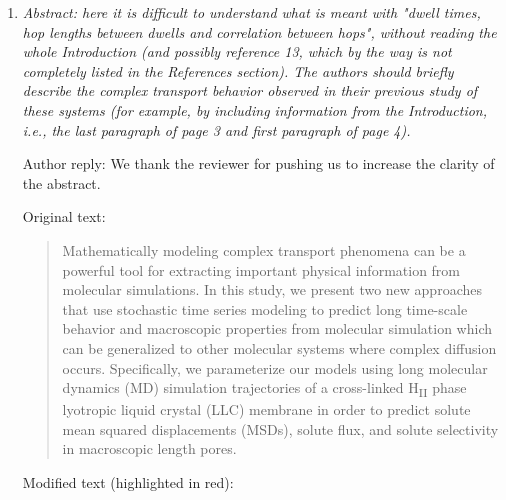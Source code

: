 \documentclass{article}
\begin{document}
\begin{enumerate}[label={Comment \theenumi :}, leftmargin=3.9\parindent]  

    \item \textit{ Abstract: here it is difficult to understand what is meant with "dwell times, hop 
    lengths between dwells and correlation between hops", without reading the whole Introduction (and 
    possibly reference 13, which by the way is not completely listed in the References section). The 
    authors should briefly describe the complex transport behavior observed in their previous study of
    these systems (for example, by including information from the Introduction, i.e., the last paragraph
    of page 3 and first paragraph of page 4).}
    
    Author reply: We thank the reviewer for pushing us to increase the clarity of the abstract. 
    
    Original text:
    
    \begin{quote}
    Mathematically modeling complex transport phenomena can be a powerful tool
    for extracting important physical information from molecular simulations. 
    In this study, we present two new approaches that use stochastic time series
    modeling to predict long time-scale behavior and macroscopic properties 
    from molecular simulation which can be generalized to other molecular systems
    where complex diffusion occurs. Specifically, we parameterize our models using
    long molecular dynamics (MD) simulation trajectories of a cross-linked 
    H\textsubscript{II} phase lyotropic liquid crystal (LLC) membrane in order to
    predict solute mean squared displacements (MSDs), solute flux, and
    solute selectivity in macroscopic length pores.    
    \end{quote}
    
	Modified text (highlighted in red):
	

\end{enumerate}
\end{document}

